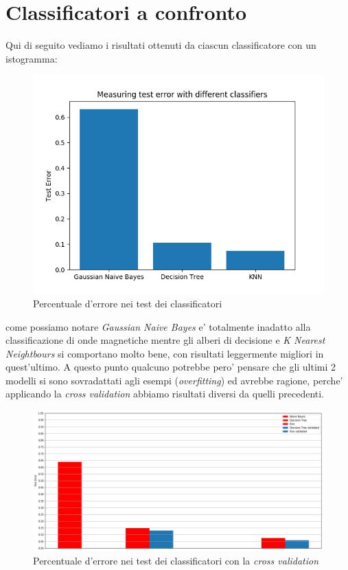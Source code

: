 \section{Classificatori a confronto}
Qui di seguito vediamo i risultati ottenuti da ciascun classificatore con un istogramma:

\begin{figure}[H]
	\centering
	\includegraphics[width=0.7\linewidth]{img/test_errors}
	\caption{Percentuale d'errore nei test dei classificatori}
	\label{fig:testerrors}
\end{figure}

come possiamo notare \textit{Gaussian Naive Bayes} e' totalmente inadatto alla classificazione di onde magnetiche mentre gli alberi di decisione e \textit{K Nearest Neightbours} si comportano molto bene, con risultati leggermente migliori in quest'ultimo.
A questo punto qualcuno potrebbe pero' pensare che gli ultimi 2 modelli si sono sovradattati agli esempi (\textit{overfitting}) ed avrebbe ragione, perche' applicando la \textit{cross validation} abbiamo risultati diversi da quelli precedenti.

\begin{figure}[H]
	\centering
	\includegraphics[width=1\linewidth]{img/test_errors_cross_validation}
	\caption{Percentuale d'errore nei test dei classificatori con la \textit{cross validation}}
	\label{fig:testerrorscrossvalidation}
\end{figure}

